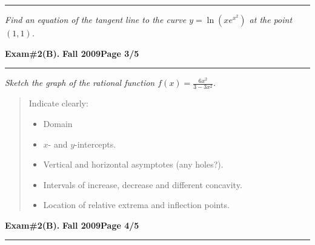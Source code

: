 \documentclass[12pt]{article}
\begin{document}
\vspace{4cm}
\vspace{5cm}

\hrule
{\problem[10 pts] \em Find an equation of the tangent line to the
  curve $y=\ln(x e^{x^2})$ at the point $(1,1)$.} 
\newpage

\hfill{\large\bf Exam\#2(B).}\hfill{\large\bf
  Fall 2009}\hfill{\large\bf Page 3/5}\hrule

\bigskip
{\problem[30 pts] \em Sketch the graph of the rational function $f(x)
  = \displaystyle{\frac{6x^2}{3-3x^2}}$.}
\begin{quotation}
Indicate clearly:
\begin{itemize}
\item Domain
\item $x$- and $y$-intercepts.
\item Vertical and horizontal asymptotes (any holes?).
\item Intervals of increase, decrease and different concavity.
\item Location of relative extrema and inflection points. 
\end{itemize}
\end{quotation}
\newpage

\hfill{\large\bf Exam\#2(B).}\hfill{\large\bf
  Fall 2009}\hfill{\large\bf Page 4/5}\hrule
\end{document}
